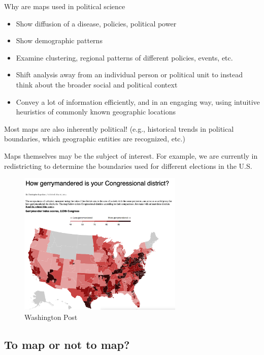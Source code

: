 \documentclass[
  letterpaper,
  DIV=11,
  numbers=noendperiod]{scrreprt}
\providecommand{\tightlist}{%
  \setlength{\itemsep}{0pt}\setlength{\parskip}{0pt}}\usepackage{longtable,booktabs,array}
\begin{document}
Why are maps used in political science

\begin{itemize}
\tightlist
\item
  Show diffusion of a disease, policies, political power
\item
  Show demographic patterns
\item
  Examine clustering, regional patterns of different policies, events,
  etc.
\item
  Shift analysis away from an individual person or political unit to
  instead think about the broader social and political context
\item
  Convey a lot of information efficiently, and in an engaging way, using
  intuitive heuristics of commonly known geographic locations
\end{itemize}

Most maps are also inherently political! (e.g., historical trends in
political boundaries, which geographic entities are recognized, etc.)

Maps themselves may be the subject of interest. For example, we are
currently in redistricting to determine the boundaries used for
different elections in the U.S.

\begin{figure}

{\centering \includegraphics[width=0.7\textwidth,height=\textheight]{images/gerrym.png}

}

\caption{Washington Post}

\end{figure}

\hypertarget{to-map-or-not-to-map}{%
\subsection{To map or not to map?}\label{to-map-or-not-to-map}}
\end{document}
